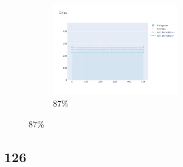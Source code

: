 \documentclass[12pt, fleqn]{report}                             %
\theoremstyle{break}                                            %
\begin{document}
\begin{figure}[ht!]
\begin{subfigure}[b]{0.4\linewidth}
          \includegraphics[width=0.6\textwidth]{Images/122/dia-d.png}
          \caption{87\%}
        \end{subfigure}
      \end{figure}


      \clearpage
      \subsection{126}
\end{document}
